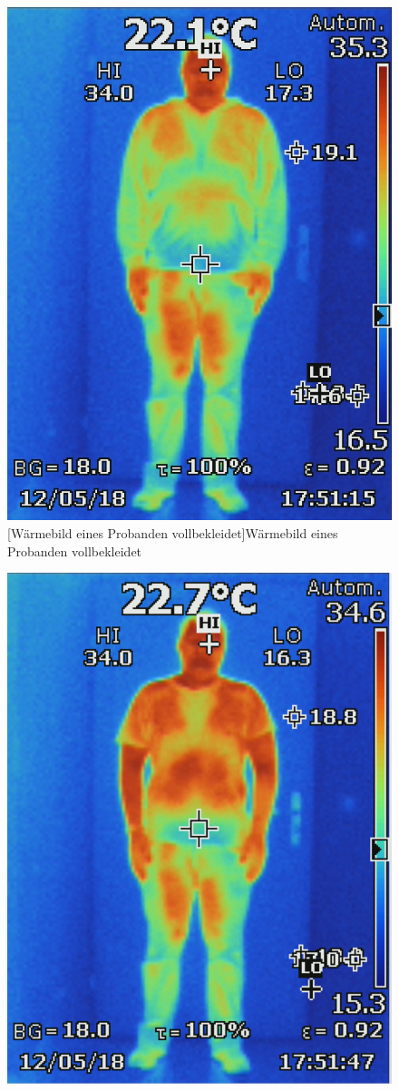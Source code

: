 \begin{figure}[!ht]
	\centering
	\begin{minipage}[b]{0.45\linewidth}
		\centering	
		\includegraphics[width=0.8\linewidth]{fig/waermebild1.jpg}
		[Wärmebild eines Probanden vollbekleidet]{Wärmebild eines Probanden vollbekleidet}
		\label{fig:Waermebild}
	\end{minipage}
	\hfill
	\begin{minipage}[b]{0.45\linewidth}
		\centering
		\includegraphics[width=0.8\linewidth]{fig/waermebild2.png}

\end{minipage}
\end{figure}
